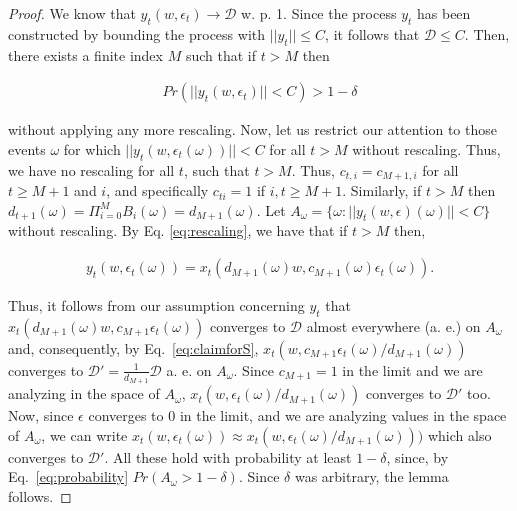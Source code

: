 \documentclass[jair, twoside,11pt,theapa]{article}
\begin{document}
\begin{proof}

We know that $y_t(w, \epsilon_t) \xrightarrow{} \mathcal{D}$ w. p. 1. Since the process $y_t$ has been constructed by bounding the process with $|| y_t ||\leq C$, it follows that $\mathcal{D} \leq C$. Then, there exists a finite index $M$ such that if $t>M$ then 

\begin{equation}\label{eq:probability}
    \begin{array}{l}
         Pr(||y_t(w, \epsilon_t)|| < C) > 1 - \delta
    \end{array}
\end{equation}


\noindent without applying any more rescaling. Now, let us restrict our attention to those events $\omega$ for which $||y_t(w, \epsilon_t(\omega))|| < C$ for all $t > M$ without rescaling. Thus, we have no rescaling for all $t$, such that $t>M$. Thus, $c_{t,i} = c_{M+1,i}$ for all $t \geq M+1$ and $i$, and specifically $c_{ti} = 1$ if $i,t \geq M + 1$. Similarly, if $t>M$ then $d_{t+1}(\omega) = \Pi_{i=0}^{M} B_i (\omega) = d_{M +1} (\omega)$. Let $A_\omega = \{\omega: ||y_t(w, \epsilon)(\omega)|| < C\}$ without rescaling. By Eq. \ref{eq:rescaling}, we have that if $t>M$ then, 

\begin{equation}
    \begin{array}{l}
         y_t(w, \epsilon_t(\omega)) = 
         x_t(d_{M+1}(\omega)w, c_{M+1}(\omega) \epsilon_t(\omega)).
    \end{array}
\end{equation}

Thus, it follows from our assumption concerning $y_t$ that $x_t(d_{M+1}(\omega) w, c_{M+1} \epsilon_t(\omega))  $ converges to $\mathcal{D}$ almost everywhere (a. e.) on $A_\omega$ and, consequently, by Eq.~\ref{eq:claimforS}, $x_t(w, c_{M+1}\epsilon_t(\omega)/d_{M+1}(\omega))$ converges to $\mathcal{D}' = \frac{1}{d_{M+1}}\mathcal{D}$ a. e. on $A_{\omega}$. Since $c_{M+1} = 1$ in the limit and we are analyzing in the space of $A_\omega$, $x_t(w, \epsilon_t(\omega)/d_{M+1}(\omega))$ converges to $\mathcal{D}'$ too. Now, since $\epsilon$ converges to 0 in the limit, and we are analyzing values in the space of $A_\omega$, we can write $x_t(w, \epsilon_t(\omega)) \approx x_t(w, \epsilon_t(\omega)/d_{M+1}(\omega)))$ which also converges to $\mathcal{D}'$. All these hold with probability at least $1-\delta$, since, by Eq.~\ref{eq:probability}  $Pr(A_{\omega} > 1- \delta)$. Since $\delta$ was arbitrary, the lemma follows. 

\end{proof}
\end{document}
